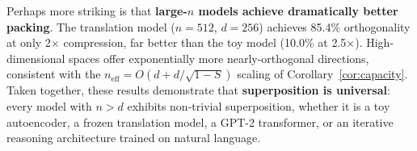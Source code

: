 Perhaps more striking is that \textbf{large-$n$ models achieve dramatically better packing}. The translation model ($n=512$, $d=256$) achieves 85.4\% orthogonality at only 2$\times$ compression, far better than the toy model (10.0\% at 2.5$\times$). High-dimensional spaces offer exponentially more nearly-orthogonal directions, consistent with the $n_{\text{eff}} = O(d + d/\sqrt{1-S})$ scaling of Corollary~\ref{cor:capacity}. Taken together, these results demonstrate that \textbf{superposition is universal}: every model with $n > d$ exhibits non-trivial superposition, whether it is a toy autoencoder, a frozen translation model, a GPT-2 transformer, or an iterative reasoning architecture trained on natural language.
